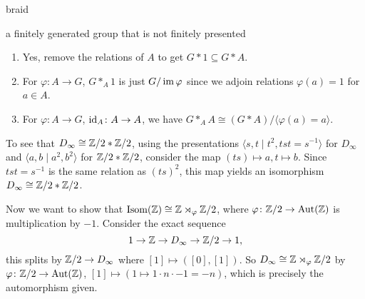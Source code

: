 \begin{ex}
    braid
\end{ex}
\begin{ex}
a finitely generated group that is not finitely presented
\end{ex}
\begin{ex}
    \begin{enumerate}[label=(\arabic*)]
    \setlength\itemsep{-.2em}
        \item Yes, remove the relations of $A$ to get $G * 1 \subseteq G *A$.
        \item For $\varphi  \colon A \to G$, $G *_A 1$ is just $G /\operatorname{im} \varphi $ since we adjoin relations $\varphi (a)=1$ for $a \in A$.
        \item For $\varphi  \colon A \to G$, $\operatorname{id}_A \colon A \to A$, we have $G *_A A \cong (G * A) / \langle \varphi (a)=a \rangle $.
    \end{enumerate}
\end{ex}
\begin{ex}
    To see that $D_{\infty}\cong  \mathbb{Z} /2 * \mathbb{Z} /2$, using the presentations $\langle s,t \mid t^2, tst= s ^{-1} \rangle $ for $D _{\infty}$ and $\langle a,b \mid a^2,b^2 \rangle $ for $\mathbb{Z} /2 * \mathbb{Z} /2$, consider the map $(ts) \mapsto a, t \mapsto b$. Since $tst = s ^{-1}$ is the same relation as $(ts)^2$, this map yields an isomorphism $D _{\infty} \cong \mathbb{Z} /2 * \mathbb{Z} /2$.

    Now we want to show that $\mathrm{Isom}(\mathbb{Z}) \cong \mathbb{Z} \rtimes _{\varphi }\mathbb{Z} /2$, where $\varphi  \colon \mathbb{Z} /2 \to \mathrm{Aut}(\mathbb{Z})$ is multiplication by $-1$. 
    Consider the exact sequence \[
    1 \to \mathbb{Z} \to  D _{\infty}\to \mathbb{Z} /2 \to 1,
\] this splits by $\mathbb{Z} /2 \to D _{\infty}$ where $[1] \mapsto ([0], [1])$. So $ D_{\infty}\cong \mathbb{Z} \rtimes _{\varphi }\mathbb{Z} /2$ by $\varphi  \colon \mathbb{Z} /2 \to \mathrm{Aut}(\mathbb{Z} )$, $[1] \mapsto ( 1 \mapsto 1 \cdot  n \cdot  -1=-n)$, which is precisely the automorphism given.
\end{ex}
